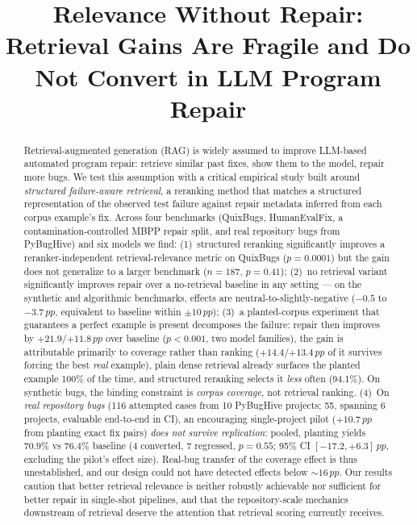 \documentclass[10pt,conference]{IEEEtran}
\newcommand{\pp}{\,pp}
\begin{document}
\title{Relevance Without Repair: Retrieval Gains Are Fragile and Do Not
  Convert in LLM Program Repair}

\author{
}

\maketitle

\begin{abstract}
Retrieval-augmented generation (RAG) is widely assumed to improve LLM-based
automated program repair: retrieve similar past fixes, show them to the
model, repair more bugs. We test this assumption with a critical empirical
study built around \emph{structured failure-aware retrieval}, a reranking
method that matches a structured representation of the observed test failure
against repair metadata inferred from each corpus example's fix. Across four
benchmarks (QuixBugs, HumanEvalFix, a contamination-controlled MBPP repair
split, and real repository bugs from PyBugHive) and six models we find:
(1)~structured reranking significantly improves a reranker-independent
retrieval-relevance metric on QuixBugs ($p{=}0.0001$) but the gain does not
generalize to a larger benchmark ($n{=}187$, $p{=}0.41$); (2)~no retrieval
variant significantly improves repair over a no-retrieval baseline in any
setting --- on the synthetic and algorithmic benchmarks, effects are
neutral-to-slightly-negative ($-0.5$ to $-3.7\pp$, equivalent to baseline
within $\pm 10\pp$); (3)~a planted-corpus experiment that guarantees a
perfect example is present decomposes the failure: repair then improves by
$+21.9$/$+11.8\pp$ over baseline ($p{<}0.001$, two model families), the
gain is attributable primarily to coverage rather than ranking
($+14.4$/$+13.4\pp$ of it survives forcing the best \emph{real} example),
plain dense retrieval already surfaces the planted example 100\% of the
time, and structured reranking selects it \emph{less} often (94.1\%).
On synthetic bugs, the binding constraint is \emph{corpus coverage}, not
retrieval ranking. (4)~On \emph{real repository bugs} (116 attempted cases
from 10 PyBugHive projects; 55, spanning 6 projects, evaluable end-to-end
in CI), an encouraging single-project pilot ($+10.7\pp$ from planting exact
fix pairs) \emph{does not survive replication}: pooled, planting yields
$70.9\%$ vs $76.4\%$ baseline (4 converted, 7 regressed, $p{=}0.55$; 95\%
CI $[-17.2, +6.3]\pp$, excluding the pilot's effect size). Real-bug
transfer of the coverage effect is thus unestablished, and our design
could not have detected effects below ${\sim}16\pp$. Our results caution
that better retrieval relevance is neither robustly achievable nor
sufficient for better repair in single-shot pipelines, and that the
repository-scale mechanics downstream of retrieval deserve the attention
that retrieval scoring currently receives.
\end{abstract}
\end{document}
